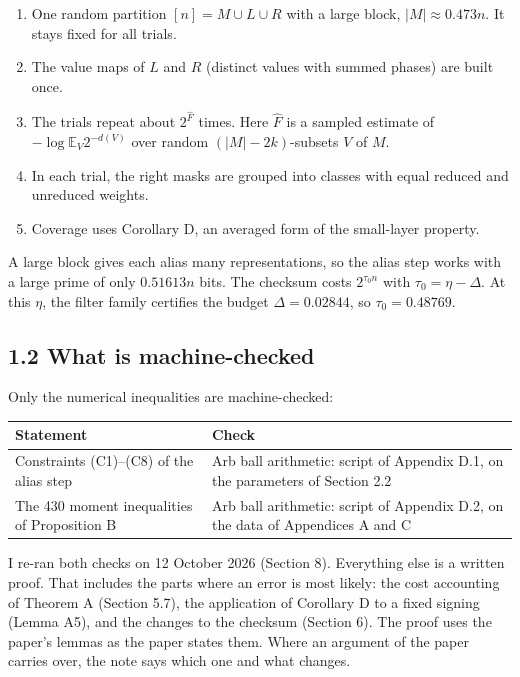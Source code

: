 \documentclass[10pt,a4paper]{article}
\begin{document}
\begin{enumerate}
\item One random partition $[n] = M \cup L \cup R$ with a large block, $|M| \approx 0.473n$. It stays fixed for all trials.
\item The value maps of $L$ and $R$ (distinct values with summed phases) are built once.
\item The trials repeat about $2^{\hat F}$ times. Here $\hat F$ is a sampled estimate of $-\log\mathbb E_V 2^{-d(V)}$
over random $(|M| - 2k)$-subsets $V$ of $M$.
\item In each trial, the right masks are grouped into classes with equal reduced and unreduced weights.
\item Coverage uses Corollary D, an averaged form of the small-layer property.
\end{enumerate}

A large block gives each alias many representations, so the alias step works with a large prime of only $0.51613n$
bits. The checksum costs $2^{\tau_0 n}$ with $\tau_0 = \eta - \Delta$. At this $\eta$, the filter family certifies the
budget $\Delta = 0.02844$, so $\tau_0 = 0.48769$.

\subsection*{1.2 What is machine-checked}

Only the numerical inequalities are machine-checked:

{\small
\begin{longtable}{>{\raggedright\arraybackslash}p{0.361\dimexpr\linewidth-4\tabcolsep\relax}>{\raggedright\arraybackslash}p{0.639\dimexpr\linewidth-4\tabcolsep\relax}}
\hline
\textbf{Statement} & \textbf{Check} \\ \hline
\endhead
Constraints (C1)--(C8) of the alias step & Arb ball arithmetic: script of Appendix D.1, on the parameters of Section 2.2 \\
The 430 moment inequalities of Proposition B & Arb ball arithmetic: script of Appendix D.2, on the data of Appendices A and C \\
\hline
\end{longtable}}

I re-ran both checks on 12 October 2026 (Section 8). Everything else is a written proof. That includes the parts
where an error is most likely: the cost accounting of Theorem A (Section 5.7), the application of Corollary D to a
fixed signing (Lemma A5), and the changes to the checksum (Section 6). The proof uses the paper's lemmas as the paper
states them. Where an argument of the paper carries over, the note says which one and what changes.
\end{document}
